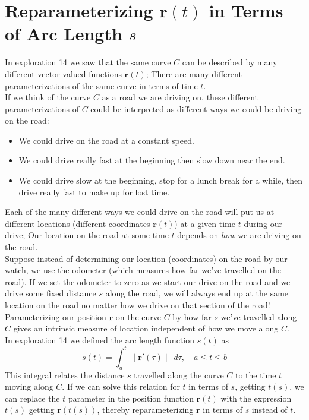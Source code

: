 \documentclass[12pt,letterpaper,fleqn]{article}
\begin{document}
\section*{Reparameterizing $\pmb{r}(t)$ in Terms of Arc Length $s$}
In exploration 14 we saw that the same curve $C$ can be described by many different vector valued functions $\pmb{r}(t)$; There are many different parameterizations of the same curve in terms of time $t$.\\[1.5ex] If we think of the curve $C$ as a road we are driving on, these different parameterizations of $C$ could be interpreted as different ways we could be driving on the road:
\begin{itemize}
 \item We could drive on the road at a constant speed.
 \item We could drive really fast at the beginning then slow down near the end.
 \item We could drive slow at the beginning, stop for a lunch break for a while, then drive really fast to make up for lost time.
\end{itemize}
Each of the many different ways we could drive on the road will put us at different locations (different coordinates $\pmb{r}(t)$) at a given time $t$ during our drive; Our location on the road at some time $t$ depends on \emph{how} we are driving on the road.\\[1.5ex] Suppose instead of determining our location (coordinates) on the road by our watch, we use the odometer (which measures how far we've travelled on the road). If we set the odometer to zero as we start our drive on the road and we drive some fixed distance $s$ along the road, we will always end up at the same location on the road no matter how we drive on that section of the road!\\[1.5ex] Parameterizing our position $\pmb{r}$ on the curve $C$ by how far $s$ we've travelled along $C$ gives an intrinsic measure of location independent of how we move along $C$.\\[1.5ex]
In exploration 14 we defined the arc length function $s(t)$ as
\begin{equation*}
 s(t) = \int_a^t \|\pmb{r}'(\tau)\|\;d\tau, \quad a\leq t\leq b
\end{equation*}
This integral relates the distance $s$ travelled along the curve $C$ to the time $t$ moving along $C$. If we can solve this relation for $t$ in terms of $s$, getting $t(s)$, we can replace the $t$ parameter in the position function $\pmb{r}(t)$ with the expression $t(s)$ getting $\pmb{r}(t(s))$, thereby reparameterizing $\pmb{r}$ in terms of $s$ instead of $t$.
\newpage
\end{document}
